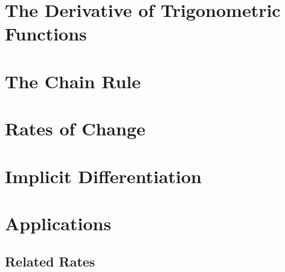 \section{The Derivative of Trigonometric Functions}

\section{The Chain Rule}


\section{Rates of Change}

\section{Implicit Differentiation}

\section{Applications}

\subsection{Related Rates}
